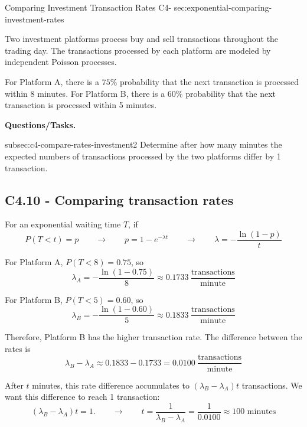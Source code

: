 	\sectionScored
	{Comparing Investment Transaction Rates}
	{C4-}
	{sec:exponential-comparing-investment-rates}
	{
		Two investment platforms process buy and sell transactions throughout
		the trading day. The transactions processed by each platform are
		modeled by independent Poisson processes.
		
		For Platform A, there is a \(75\%\) probability that the next
		transaction is processed within 8 minutes. For Platform B, there is
		a \(60\%\) probability that the next transaction is processed within
		5 minutes.

		\textbf{Questions/Tasks.}
		\begin{enumerate}
			\CriterionTask
			{subsec:c4-compare-rates-investment}{2}
			{Determine after how many minutes the expected numbers of transactions processed by the two platforms differ by 1 transaction. }
		\end{enumerate}
		
		\subsection*{C4.10 - Comparing transaction rates}
		\label{subsec:c4-compare-rates-investment}
		
		For an exponential waiting time \(T\), if
		$$
		P(T<t)=p
		\qquad \longrightarrow \qquad
		p=1-e^{-\lambda t}
		\qquad \longrightarrow \qquad
		{
			\lambda=-\frac{\ln(1-p)}{t}
		}
		$$
		
		For Platform A, \(P(T<8)=0.75\), so
		$$
		\lambda_A
		=-\frac{\ln(1-0.75)}{8}
		\approx0.1733
		\>\frac{\text{transactions}}{\text{minute}}
		$$
		
		For Platform B, \(P(T<5)=0.60\), so
		$$
		\lambda_B
		=-\frac{\ln(1-0.60)}{5}
		\approx0.1833
		\>\frac{\text{transactions}}{\text{minute}}
		$$
		
		Therefore, Platform B has the higher transaction rate. The difference between the rates is
		$$
		\lambda_B-\lambda_A
		\approx0.1833-0.1733
		=0.0100
		\>\frac{\text{transactions}}{\text{minute}}
		$$
		
		After \(t\) minutes, this rate difference accumulates to
		$
		(\lambda_B-\lambda_A)t
		$
		transactions. We want this difference to reach 1 transaction:
		$$
		(\lambda_B-\lambda_A)t=1.
		\qquad \longrightarrow \qquad
		t
		=\frac{1}{\lambda_B-\lambda_A}
		=\frac{1}{0.0100}
		\approx \boxed{100\text{ minutes}}
		$$
		
		
	}
	
	

